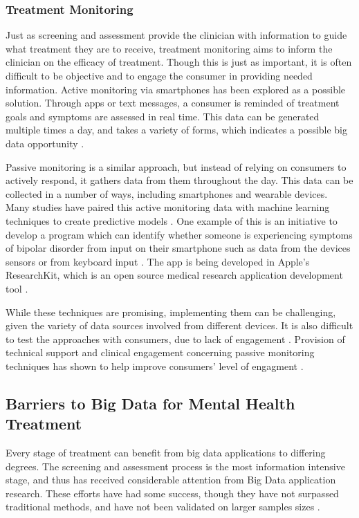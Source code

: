 \documentclass[sigconf]{acmart}
\begin{document}
\subsubsection{Treatment Monitoring}

Just as screening and assessment provide the clinician with information to guide what treatment they are to receive, treatment monitoring aims to inform the clinician on the efficacy of treatment. Though this is just as important, it is often difficult to be objective and to engage the consumer in providing needed information. Active monitoring via smartphones has been explored as a possible solution. Through apps or text messages, a consumer is reminded of treatment goals and symptoms are assessed in real time. This data can be generated multiple times a day, and takes a variety of forms, which indicates a possible big data opportunity \cite{bitreview}.

Passive monitoring is a similar approach, but instead of relying on consumers to actively respond, it gathers data from them throughout the day. This data can be collected in a number of ways, including smartphones and wearable devices. Many studies have paired this active monitoring data with machine learning techniques to create predictive models \cite{bitreview}. One example of this is an initiative to develop a program which can identify whether someone is experiencing symptoms of bipolar disorder from input on their smartphone such as data from the devices sensors or from keyboard input \cite{forbesresearchkit}. The app is being developed in Apple's ResearchKit, which is an open source medical research application development tool \cite{researchkit}.

While these techniques are promising, implementing them can be challenging, given the variety of data sources involved from different devices. It is also difficult to test the approaches with consumers, due to lack of engagement \cite{bigdatabipolar}. Provision of technical support and clinical engagement concerning passive monitoring techniques has shown to help improve consumers' level of engagment \cite{bithuman}.

\subsection{Barriers to Big Data for Mental Health Treatment}

Every stage of treatment can benefit from big data applications to differing degrees. The screening and assessment process is the most information intensive stage, and thus has received considerable attention from Big Data application research. These efforts have had some success, though they have not surpassed traditional methods, and have not been validated on larger samples sizes \cite{bigdatabipolar}.
\end{document}
